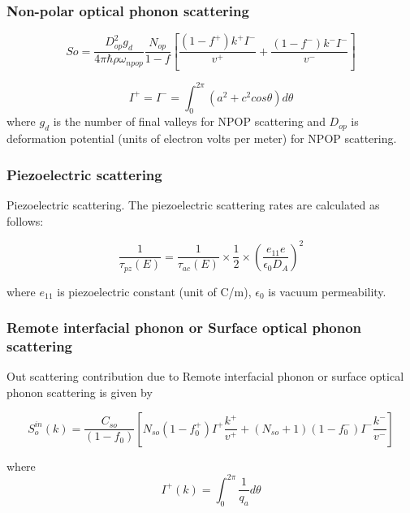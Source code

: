 \documentclass[12pt]{article}
\begin{document}
\subsubsection{Non-polar optical phonon scattering}
\begin{equation}
So = \frac{D_{op}^2 g_d}{4\pi\hbar\rho\omega_{npop}} \frac{N_{op}}{1-f} \left[  \frac{(1-f^+)k^+ I^-}{v^+} + \frac{(1-f^-)k^- I^-}{v^-}  \right]
    \label{So}
\end{equation}

\begin{equation}
I^+ = I^- = \int_0^{2\pi}(a^2 + c^2 cos\theta) d\theta
    \label{I_plus}
\end{equation}
where $g_d$ is the number of final valleys for NPOP scattering and $D_{op}$ is deformation potential (units of electron volts per meter) for NPOP scattering.

\subsubsection{Piezoelectric scattering}
Piezoelectric scattering. The piezoelectric scattering rates \cite{kaasbjerg2013acoustic} are calculated as follows: 

\begin{equation}
\frac{1}{\tau_{pz}(E)} = \frac{1}{\tau_{ac}(E)} \times \frac{1}{2}\times \left( \frac{e_{11} e}{\epsilon_0 D_{A}}\right) ^2 
\label{acoustic_rate}
\end{equation}

where $e_{11}$ is piezoelectric constant (unit of C/m), $\epsilon_0$ is vacuum permeability.   

\subsubsection{Remote interfacial phonon or Surface optical phonon scattering}

Out scattering contribution due to Remote interfacial phonon or surface optical phonon scattering is given by 

\begin{equation}
S_{o}^{in}(k) = \frac{C_{so}}{(1- f_{0})} [N_{so} (1 - f_{0}^+) I^+ \frac{k^+}{v^+}  + (N_{so}+1) (1 - f_{0}^-) I^- \frac{k^-}{v^-}]
\label{out_sc_so}
\end{equation}

where 
\begin{equation}
I^{+}(k) = \int_0^{2\pi} \frac{1}{q_{a}} d\theta 
\label{J_plus_so}
\end{equation}
\end{document}
